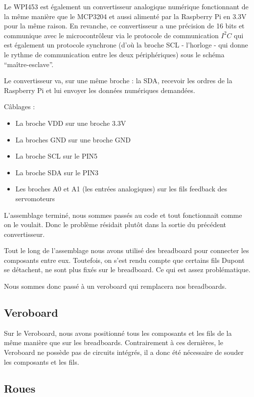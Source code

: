 \documentclass[a4paper,12pt]{report}  %
\begin{document}
Le WPI453 est également un convertisseur analogique numérique fonctionnant de la même manière que le MCP3204 et aussi alimenté par la Raspberry Pi en 3.3V pour la même raison. En revanche, ce convertisseur a une précision de 16 bits et communique avec le microcontrôleur via le protocole de communication $I^2 C$ qui est également un protocole synchrone (d’où la broche SCL - l’horloge - qui donne le rythme de communication entre les deux périphériques) sous le schéma “maître-esclave”.

Le convertisseur va, sur une même broche : la SDA, recevoir les ordres de la Raspberry Pi et lui envoyer les données numériques demandées. 

Câblages : 

\begin{itemize}
	\item La broche VDD sur une broche 3.3V
	\item La broches GND sur une broche GND
	\item La broche SCL sur le PIN5
	\item La broche SDA sur le PIN3
	\item Les broches A0 et A1 (les entrées analogiques) sur les fils feedback des servomoteurs
\end{itemize}

L’assemblage terminé, nous sommes passés au code et tout fonctionnait comme on le voulait. Donc le problème résidait plutôt dans la sortie du précédent convertisseur.

Tout le long de l’assemblage nous avons utilisé des breadboard pour connecter les composants entre eux. Toutefois, on s’est rendu compte que certains fils Dupont se détachent, ne sont plus fixés sur le breadboard. Ce qui est assez problématique. 

Nous sommes donc passé à un veroboard qui remplacera nos breadboards.

\subsection{Veroboard}

Sur le Veroboard, nous avons positionné tous les composants et les fils de la même manière que sur les breadboards. Contrairement à ces dernières, le Veroboard ne possède pas de circuits intégrés, il a donc été nécessaire de souder les composants et les fils.


\subsection{Roues}
\end{document}
